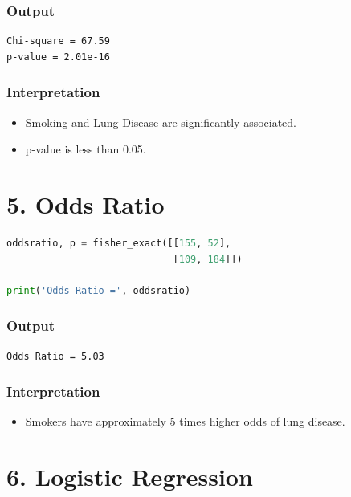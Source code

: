 \documentclass[12pt]{article}
\begin{document}
\subsubsection*{Output}

\begin{verbatim}
Chi-square = 67.59
p-value = 2.01e-16
\end{verbatim}

\subsubsection*{Interpretation}

\begin{itemize}
\item Smoking and Lung Disease are significantly associated.
\item p-value is less than 0.05.
\end{itemize}

\section*{5. Odds Ratio}

\begin{lstlisting}[language=Python]
oddsratio, p = fisher_exact([[155, 52],
                             [109, 184]])

print('Odds Ratio =', oddsratio)
\end{lstlisting}

\subsubsection*{Output}

\begin{verbatim}
Odds Ratio = 5.03
\end{verbatim}

\subsubsection*{Interpretation}

\begin{itemize}
\item Smokers have approximately 5 times higher odds of lung disease.
\end{itemize}

\section*{6. Logistic Regression}
\end{document}
